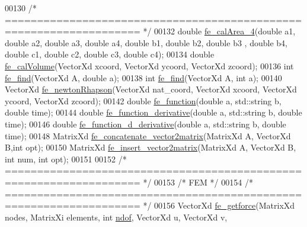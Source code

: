 \begin{DoxyCode}
00130 \textcolor{comment}{/* =================================================================== */}
00132 \textcolor{keywordtype}{double} \hyperlink{functions_8h_ac1306a43db522f3da30471d2a6c48686}{fe\_calArea\_4}(\textcolor{keywordtype}{double} a1, \textcolor{keywordtype}{double} a2, \textcolor{keywordtype}{double} a3, \textcolor{keywordtype}{double} a4, \textcolor{keywordtype}{double} b1, \textcolor{keywordtype}{double} b2, \textcolor{keywordtype}{double} b3
      , \textcolor{keywordtype}{double} b4, \textcolor{keywordtype}{double} c1, \textcolor{keywordtype}{double} c2, \textcolor{keywordtype}{double} c3, \textcolor{keywordtype}{double} c4);
00134 \textcolor{keywordtype}{double} \hyperlink{functions_8h_a00f586c9a4bc56ec486776402fc26605}{fe\_calVolume}(VectorXd xcoord, VectorXd ycoord, VectorXd zcoord);
00136 \textcolor{keywordtype}{int} \hyperlink{functions_8h_a983304137f9a961469a558437d5d2d59}{fe\_find}(VectorXd A, \textcolor{keywordtype}{double} a);
00138 \textcolor{keywordtype}{int} \hyperlink{functions_8h_a983304137f9a961469a558437d5d2d59}{fe\_find}(VectorXd A, \textcolor{keywordtype}{int} a);
00140 VectorXd \hyperlink{functions_8h_acdc9c3b5b3aecd9972c84d0cbb669978}{fe\_newtonRhapson}(VectorXd nat\_coord, VectorXd xcoord, VectorXd ycoord, VectorXd 
      zcoord);
00142 \textcolor{keywordtype}{double} \hyperlink{functions_8h_a5ce8a3cf9dcc8b599ac40f7f3a48f196}{fe\_function}(\textcolor{keywordtype}{double} a, std::string b, \textcolor{keywordtype}{double} time);
00144 \textcolor{keywordtype}{double} \hyperlink{functions_8h_aa587b020c768e2a11948bfd939829b6e}{fe\_function\_derivative}(\textcolor{keywordtype}{double} a, std::string b, \textcolor{keywordtype}{double} time);
00146 \textcolor{keywordtype}{double} \hyperlink{functions_8h_afb02d53011656285452b16427dcd08dd}{fe\_function\_d\_derivative}(\textcolor{keywordtype}{double} a, std::string b, \textcolor{keywordtype}{double} time);
00148 MatrixXd \hyperlink{functions_8h_ac2d90cb6719488bc8551e6f9437f4f76}{fe\_concatenate\_vector2matrix}(MatrixXd A, VectorXd B,\textcolor{keywordtype}{int} opt);
00150 MatrixXd \hyperlink{functions_8h_a94d7770f842e44e01a47ae5624bd7749}{fe\_insert\_vector2matrix}(MatrixXd A, VectorXd B, \textcolor{keywordtype}{int} num, \textcolor{keywordtype}{int} opt);
00151 
00152 \textcolor{comment}{/* =================================================================== */}
00153 \textcolor{comment}{/* FEM */}
00154 \textcolor{comment}{/* =================================================================== */}
00156 VectorXd \hyperlink{functions_8h_a6696827a8591495e5ea710b112fad5ef}{fe\_getforce}(MatrixXd nodes, MatrixXi elements, \textcolor{keywordtype}{int} \hyperlink{_global_variables_8h_aa789fe4d8a13fd0990b630909430d5d0}{ndof}, VectorXd u, VectorXd v, 

\end{DoxyCode}
